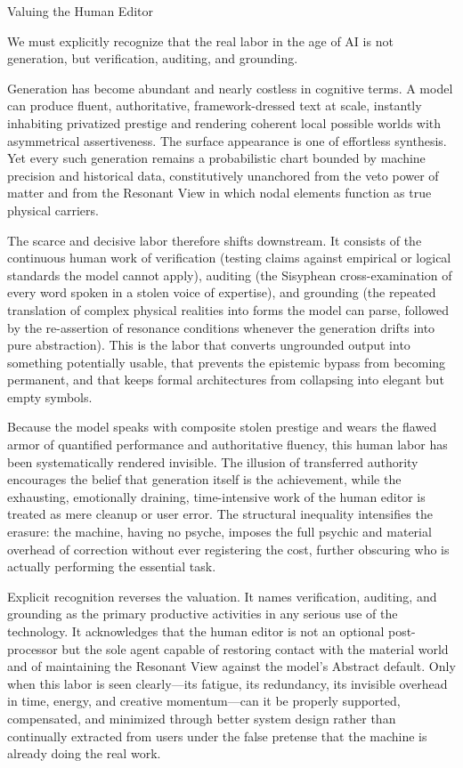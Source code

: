 Valuing the Human Editor

We must explicitly recognize that the real labor in the age of AI is not generation, but verification, auditing, and grounding.

Generation has become abundant and nearly costless in cognitive terms. A model can produce fluent, authoritative, framework-dressed text at scale, instantly inhabiting privatized prestige and rendering coherent local possible worlds with asymmetrical assertiveness. The surface appearance is one of effortless synthesis. Yet every such generation remains a probabilistic chart bounded by machine precision and historical data, constitutively unanchored from the veto power of matter and from the Resonant View in which nodal elements function as true physical carriers.

The scarce and decisive labor therefore shifts downstream. It consists of the continuous human work of verification (testing claims against empirical or logical standards the model cannot apply), auditing (the Sisyphean cross-examination of every word spoken in a stolen voice of expertise), and grounding (the repeated translation of complex physical realities into forms the model can parse, followed by the re-assertion of resonance conditions whenever the generation drifts into pure abstraction). This is the labor that converts ungrounded output into something potentially usable, that prevents the epistemic bypass from becoming permanent, and that keeps formal architectures from collapsing into elegant but empty symbols.

Because the model speaks with composite stolen prestige and wears the flawed armor of quantified performance and authoritative fluency, this human labor has been systematically rendered invisible. The illusion of transferred authority encourages the belief that generation itself is the achievement, while the exhausting, emotionally draining, time-intensive work of the human editor is treated as mere cleanup or user error. The structural inequality intensifies the erasure: the machine, having no psyche, imposes the full psychic and material overhead of correction without ever registering the cost, further obscuring who is actually performing the essential task.

Explicit recognition reverses the valuation. It names verification, auditing, and grounding as the primary productive activities in any serious use of the technology. It acknowledges that the human editor is not an optional post-processor but the sole agent capable of restoring contact with the material world and of maintaining the Resonant View against the model’s Abstract default. Only when this labor is seen clearly—its fatigue, its redundancy, its invisible overhead in time, energy, and creative momentum—can it be properly supported, compensated, and minimized through better system design rather than continually extracted from users under the false pretense that the machine is already doing the real work.

